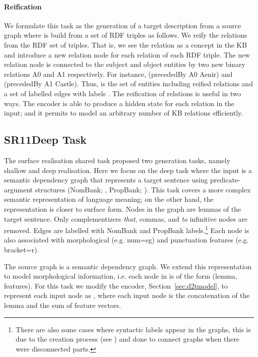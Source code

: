 \documentclass[11pt,a4paper,dvipsnames]{article}
\newcommand{\nl}[1]{\textit{{\small #1}}}
\begin{document}
\paragraph{Reification}
We formulate this task as the generation of a target description  
from a source graph  where  
is build from a set of RDF triples as follows. 
We reify the relations \cite{baader2003description} from the RDF set of 
triples. That is, we see the relation as a concept in the KB and
introduce a new relation node for each relation of each RDF triple.
The new relation node is connected to the subject and object entities 
by two new binary relations A0 and A1 respectively.
For instance, ({\sffamily precededBy A0 Aenir}) and ({\sffamily precededBy A1 Castle}).
Thus,  is the set of entities including reified relations
and   a set of labelled edges with labels .
The reification of relations is useful in two ways. The encoder is able to 
produce a hidden state for each relation in the input; and it permits to model
an arbitrary number of KB relations efficiently.


\subsection{SR11Deep Task}
The surface realisation shared task \cite{belz2011first} 
proposed two generation tasks, namely shallow and deep realisation.
Here we focus on the deep task where the input is a semantic dependency graph that
represents a target sentence using predicate-argument structures
(NomBank; \cite{meyers2004nombank}, PropBank; \cite{palmer2005proposition}).
This task covers a more complex semantic representation of
language meaning; on the other hand, the representation is closer
to surface form. 
Nodes in the graph are lemmas of the target sentence. Only complementizers \nl{that}, commas, and \nl{to}
infinitive nodes are removed. Edges are labelled with NomBank
and PropBank labels.\footnote{There are also some cases where syntactic
 labels appear in the graphs, this is due to the creation process (see \cite{belz2011first})
 and done to connect graphs when there were disconnected parts.}
Each node is also associated with morphological (e.g. num=sg) and
punctuation features (e.g. bracket=r). 

The source graph  is a semantic 
dependency graph. We extend this representation to model morphological
information, i.e. each node in  is of the form
(lemma, features). For this task we modify the encoder, Section~\ref{sec:d2tmodel},
to represent each input node as ,
where each input node is the concatenation of the lemma and the sum of feature
vectors.
\end{document}

